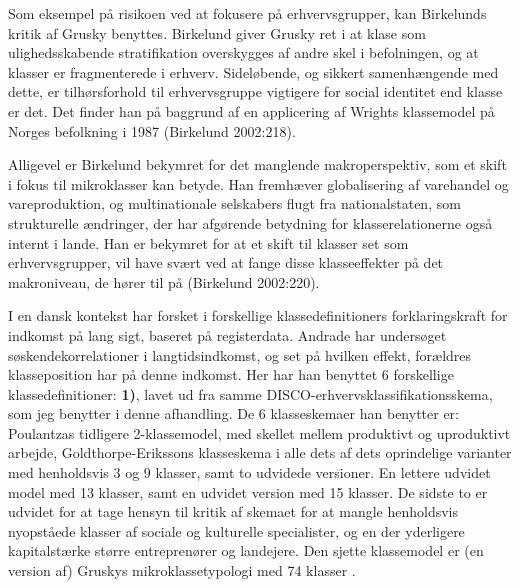 Som eksempel på risikoen ved at fokusere på erhvervsgrupper, kan Birkelunds kritik af Grusky benyttes. Birkelund giver Grusky ret i at klase som ulighedsskabende stratifikation overskygges af andre skel i befolningen, og at klasser er fragmenterede i erhverv. Sideløbende, og sikkert samenhængende med dette, er tilhørsforhold til erhvervsgruppe vigtigere for social identitet end klasse er det. Det finder han på baggrund af en applicering af Wrights klassemodel på Norges befolkning i 1987 (Birkelund 2002:218). 

Alligevel er Birkelund bekymret for det manglende makroperspektiv, som et skift i fokus til mikroklasser kan betyde. Han fremhæver globalisering af varehandel og vareproduktion, og multinationale selskabers flugt fra nationalstaten, som strukturelle ændringer, der har afgørende betydning for klasserelationerne også internt i lande. Han er bekymret for at et skift til klasser set som erhvervsgrupper, vil have svært ved at fange disse klasseeffekter på det makroniveau, de hører til på (Birkelund 2002:220). 

I en dansk kontekst har \textcite{Andrade2014} forsket i forskellige klassedefinitioners forklaringskraft for indkomst på lang sigt, baseret på registerdata. %
Andrade har undersøget søskendekorrelationer i langtidsindkomst, og set på hvilken effekt, forældres klasseposition har på denne indkomst. Her har han benyttet 6 forskellige klassedefinitioner: \textbf{1)}, lavet ud fra samme DISCO-erhvervsklassifikationsskema, som jeg benytter i denne afhandling. De 6 klasseskemaer han benytter er: Poulantzas tidligere 2-klassemodel, med skellet mellem produktivt og uproduktivt arbejde, Goldthorpe-Erikssons klasseskema i alle dets af dets oprindelige varianter med henholdsvis 3 og 9 klasser, samt to udvidede versioner. En lettere udvidet model med 13 klasser, samt en udvidet version med 15 klasser. De sidste to er udvidet for at tage hensyn til kritik af skemaet for at mangle henholdsvis nyopståede klasser af sociale og kulturelle specialister, og en der yderligere kapitalstærke større entreprenører og landejere. Den sjette klassemodel er (en version af) Gruskys mikroklassetypologi med 74 klasser \parencite[93f]{Andrade2014}.

